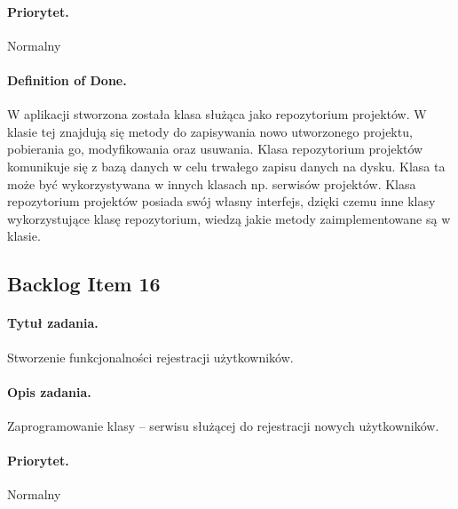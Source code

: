 \documentclass[a4paper]{article}
\begin{document}
\paragraph{Priorytet.} Normalny
\paragraph{Definition of Done.} W aplikacji stworzona została klasa służąca jako repozytorium projektów. W klasie tej znajdują się metody do zapisywania nowo utworzonego projektu, pobierania go, modyfikowania oraz usuwania. Klasa repozytorium projektów komunikuje się z bazą danych w celu trwałego zapisu danych na dysku. Klasa ta może być wykorzystywana w innych klasach np. serwisów projektów. Klasa repozytorium projektów posiada swój własny interfejs, dzięki czemu inne klasy wykorzystujące klasę repozytorium, wiedzą jakie metody zaimplementowane są w klasie.

\subsection{Backlog Item 16} 
\paragraph{Tytuł zadania.} Stworzenie funkcjonalności rejestracji użytkowników. 
\paragraph{Opis zadania.} Zaprogramowanie klasy -- serwisu służącej do rejestracji nowych użytkowników. 
\paragraph{Priorytet.} Normalny
\end{document}
